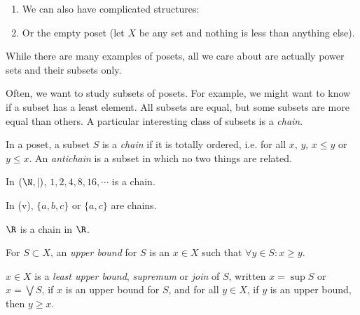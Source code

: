 \documentclass[a4paper]{article}
\begin{document}
\begin{eg}
\begin{enumerate}
\begin{center}
      \end{center}
    \item We can also have complicated structures:
      \begin{center}
      \end{center}
    \item Or the empty poset (let $X$ be any set and nothing is less than anything else).
  \end{enumerate}
\end{eg}
While there are many examples of posets, all we care about are actually power sets and their subsets only.

Often, we want to study subsets of posets. For example, we might want to know if a subset has a least element. All subsets are equal, but some subsets are more equal than others. A particular interesting class of subsets is a \emph{chain}.
\begin{defi}
  In a poset, a subset $S$ is a \emph{chain} if it is totally ordered, i.e. for all $x$, $y$, $x\leq y$ or $y\leq x$. An \emph{antichain} is a subset in which no two things are related.
\end{defi}

\begin{eg}
  In $(\N, |)$, $1, 2, 4, 8, 16, \cdots$ is a chain.

  In (v), $\{a, b, c\}$ or $\{a, c\}$ are chains.

  $\R$ is a chain in $\R$.
\end{eg}

\begin{defi}
  For $S\subset X$, an \emph{upper bound} for $S$ is an $x\in X$ such that $\forall y\in S: x \geq y$.

  $x\in X$ is a \emph{least upper bound}, \emph{supremum} or \emph{join} of $S$, written $x = \sup S$ or $x = \bigvee S$, if $x$ is an upper bound for $S$, and for all $y \in X$, if $y$ is an upper bound, then $y \geq x$.
\end{defi}
\end{document}
